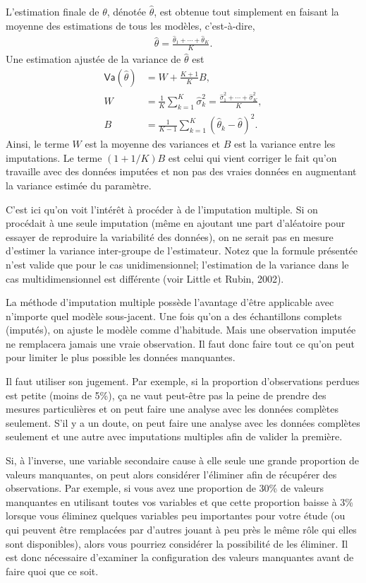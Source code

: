 \documentclass[
  11pt,
  letterpaper,
]{book}
\theoremstyle{definition}
\theoremstyle{remark}
\begin{document}
L'estimation finale de \(\theta\), dénotée \(\widehat{\theta}\), est
obtenue tout simplement en faisant la moyenne des estimations de tous
les modèles, c'est-à-dire, \begin{align*}
\widehat{\theta} = \frac{\widehat{\theta}_1 + \cdots + \widehat{\theta}_K}{K}.
\end{align*} Une estimation ajustée de la variance de
\(\widehat{\theta}\) est \begin{align*}
\mathsf{Va}(\hat{\theta}) &= W+ \frac{K+1}{K}B, 
\\ W &= \frac{1}{K} \sum_{k=1}^K \widehat{\sigma}^2_k = \frac{\widehat{\sigma}_1^2 + \cdots + \widehat{\sigma}_K^2}{K},\\
B &= \frac{1}{K-1} \sum_{k=1}^K (\widehat{\theta}_k - \widehat{\theta})^2.
\end{align*} Ainsi, le terme \(W\) est la moyenne des variances et \(B\)
est la variance entre les imputations. Le terme \((1+1/K)B\) est celui
qui vient corriger le fait qu'on travaille avec des données imputées et
non pas des vraies données en augmentant la variance estimée du
paramètre.

C'est ici qu'on voit l'intérêt à procéder à de l'imputation multiple. Si
on procédait à une seule imputation (même en ajoutant une part
d'aléatoire pour essayer de reproduire la variabilité des données), on
ne serait pas en mesure d'estimer la variance inter-groupe de
l'estimateur. Notez que la formule présentée n'est valide que pour le
cas unidimensionnel; l'estimation de la variance dans le cas
multidimensionnel est différente (voir Little et Rubin, 2002).

La méthode d'imputation multiple possède l'avantage d'être applicable
avec n'importe quel modèle sous-jacent. Une fois qu'on a des
échantillons complets (imputés), on ajuste le modèle comme d'habitude.
Mais une observation imputée ne remplacera jamais une vraie observation.
Il faut donc faire tout ce qu'on peut pour limiter le plus possible les
données manquantes.

Il faut utiliser son jugement. Par exemple, si la proportion
d'observations perdues est petite (moins de 5\%), ça ne vaut peut-être
pas la peine de prendre des mesures particulières et on peut faire une
analyse avec les données complètes seulement. S'il y a un doute, on peut
faire une analyse avec les données complètes seulement et une autre avec
imputations multiples afin de valider la première.

Si, à l'inverse, une variable secondaire cause à elle seule une grande
proportion de valeurs manquantes, on peut alors considérer l'éliminer
afin de récupérer des observations. Par exemple, si vous avez une
proportion de 30\% de valeurs manquantes en utilisant toutes vos
variables et que cette proportion baisse à 3\% lorsque vous éliminez
quelques variables peu importantes pour votre étude (ou qui peuvent être
remplacées par d'autres jouant à peu près le même rôle qui elles sont
disponibles), alors vous pourriez considérer la possibilité de les
éliminer. Il est donc nécessaire d'examiner la configuration des valeurs
manquantes avant de faire quoi que ce soit.
\end{document}
